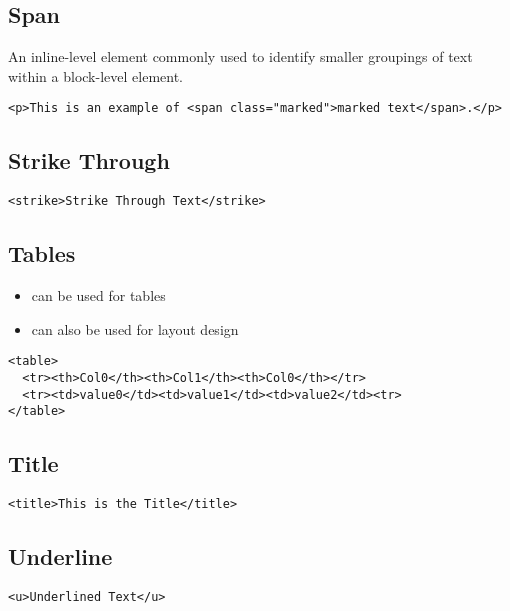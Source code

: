 \documentclass{article}
\begin{document}
\subsection{Span}
An inline-level element commonly used to identify smaller groupings of text
within a block-level element.
\begin{lstlisting}
<p>This is an example of <span class="marked">marked text</span>.</p>
\end{lstlisting}

\subsection{Strike Through}
\begin{lstlisting}
<strike>Strike Through Text</strike>
\end{lstlisting}

\subsection{Tables}
\begin{itemize}
  \item can be used for tables
  \item can also be used for layout design
\end{itemize}

\begin{lstlisting}
<table>
  <tr><th>Col0</th><th>Col1</th><th>Col0</th></tr>
  <tr><td>value0</td><td>value1</td><td>value2</td><tr>
</table>
\end{lstlisting}

\subsection{Title}
\begin{lstlisting}
<title>This is the Title</title>
\end{lstlisting}

\subsection{Underline}
\begin{lstlisting}
<u>Underlined Text</u>
\end{lstlisting}

\end{document}
